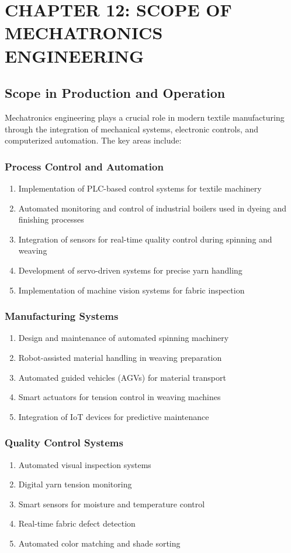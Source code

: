 \section{CHAPTER 12: SCOPE OF MECHATRONICS ENGINEERING}
\subsection{Scope in Production and Operation}
Mechatronics engineering plays a crucial role in modern textile manufacturing through the integration of mechanical systems, electronic controls, and computerized automation. The key areas include:
\subsubsection{Process Control and Automation}
\begin{enumerate}
\item Implementation of PLC-based control systems for textile machinery
\item Automated monitoring and control of industrial boilers used in dyeing and finishing processes
\item Integration of sensors for real-time quality control during spinning and weaving
\item Development of servo-driven systems for precise yarn handling
\item Implementation of machine vision systems for fabric inspection
\end{enumerate}
\subsubsection{Manufacturing Systems}
\begin{enumerate}
\item Design and maintenance of automated spinning machinery
\item Robot-assisted material handling in weaving preparation
\item Automated guided vehicles (AGVs) for material transport
\item Smart actuators for tension control in weaving machines
\item Integration of IoT devices for predictive maintenance
\end{enumerate}
\subsubsection{Quality Control Systems}
\begin{enumerate}
\item Automated visual inspection systems
\item Digital yarn tension monitoring
\item Smart sensors for moisture and temperature control
\item Real-time fabric defect detection
\item Automated color matching and shade sorting
\end{enumerate}
